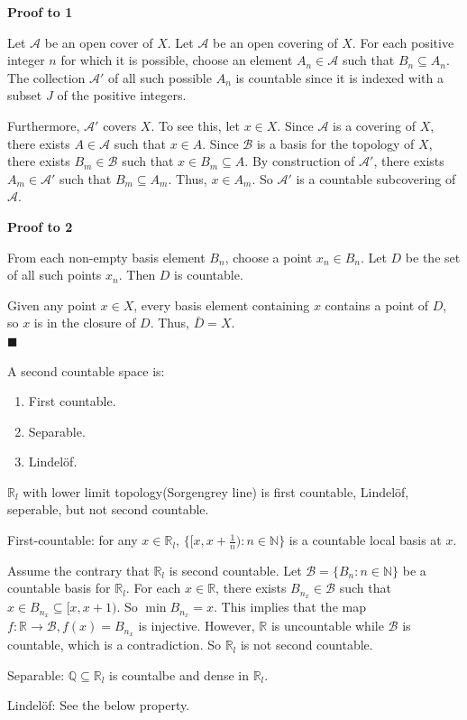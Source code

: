 \documentclass[main.tex]{subfiles}
\begin{document}
\par \noindent \textbf{Proof to 1}
\par Let $\mathcal{A}$ be an open cover of $X$. Let $\mathcal{A}$ be an open covering of $X$. For each positive integer $n$ for which it is possible, choose an element $A_n \in \mathcal{A}$ such that $B_n \subseteq A_n$. The collection $\mathcal{A}'$ of all such possible $A_n$ is countable since it is indexed with a subset $J$ of the positive integers. 
\par Furthermore, $\mathcal{A}'$ covers $X$. To see this, let $x \in X$. Since $\mathcal{A}$ is a covering of $X$, there exists $A \in \mathcal{A}$ such that $x \in A$. Since $\mathcal{B}$ is a basis for the topology of $X$, there exists $B_m \in \mathcal{B}$ such that $x \in B_m \subseteq A$. By construction of $\mathcal{A}'$, there exists $A_m \in \mathcal{A}'$ such that $B_m \subseteq A_m$. Thus, $x \in A_m$. So $\mathcal{A}'$ is a countable subcovering of $\mathcal{A}$. 
\par \noindent \textbf{Proof to 2} 
\par From each non-empty basis element $B_n$, choose a point $x_n \in B_n$. Let $D$ be the set of all such points $x_n$. Then $D$ is countable. 
\par Given any point $x \in X$, every basis element containing $x$ contains a point of $D$, so $x$ is in the closure of $D$. Thus, $\bar{D} = X$. 
\mbox{} \\ \null \hfill $\blacksquare$ 

\begin{property}
    A second countable space is: 
    \begin{enumerate}
        \item First countable.
        \item Separable.
        \item Lindelöf.
    \end{enumerate}
\end{property}

\begin{example}
    $\mathbb{R}_l$ with lower limit topology(Sorgengrey line) is first countable, Lindelöf, seperable, but not second countable. 
    \par First-countable: for any $x \in \mathbb{R}_l$, $\{[x, x + \frac{1}{n}): n \in \mathbb{N}\}$ is a countable local basis at $x$. 
    \par Assume the contrary that $\mathbb{R}_l$ is second countable. Let $\mathcal{B} = \{B_n: n \in \mathbb{N}\}$ be a countable basis for $\mathbb{R}_l$. For each $x \in \mathbb{R}$, there exists $B_{n_x} \in \mathcal{B}$ such that $x \in B_{n_x} \subseteq [x, x + 1)$. So $\min B_{n_x} = x$. This implies that the map $f: \mathbb{R} \to \mathcal{B}, f(x) = B_{n_x}$ is injective. However, $\mathbb{R}$ is uncountable while $\mathcal{B}$ is countable, which is a contradiction. So $\mathbb{R}_l$ is not second countable. 
    \par Separable: $\mathbb{Q} \subseteq \mathbb{R}_l$ is countalbe and dense in $\mathbb{R}_l$. 
    \par Lindelöf: See the below property. 
\end{example}
\end{document}
